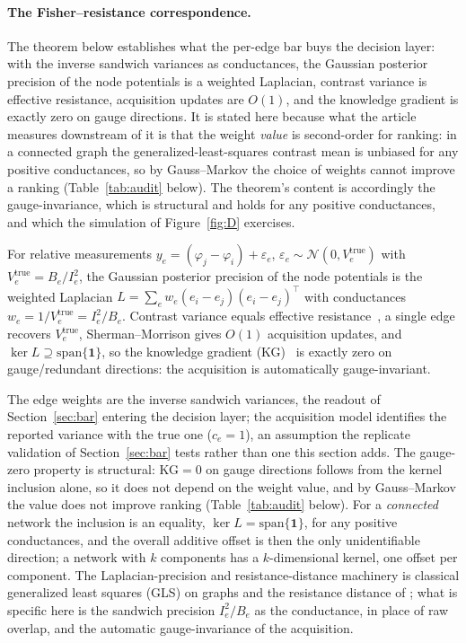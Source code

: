 \paragraph{The Fisher--resistance correspondence.} The theorem below establishes what the
per-edge bar buys the decision layer: with the inverse sandwich variances as conductances, the
Gaussian posterior precision of the node potentials is a weighted Laplacian, contrast variance is
effective resistance, acquisition updates are $O(1)$, and the knowledge gradient is exactly zero on
gauge directions. It is stated here because what the article measures downstream of it is that the
weight \emph{value} is second-order for ranking: in a connected graph
the generalized-least-squares contrast mean is unbiased for any positive conductances, so by
Gauss--Markov the choice of weights cannot improve a ranking (Table~\ref{tab:audit} below). The
theorem's content is accordingly the gauge-invariance, which is structural and holds for any
positive conductances, and which the simulation of Figure~\ref{fig:D} exercises.

\begin{theorem}\label{thm:fr}
For relative measurements $y_e=(\varphi_j-\varphi_i)+\varepsilon_e$,
$\varepsilon_e\sim\mathcal N(0,V_e^{\mathrm{true}})$ with $V_e^{\mathrm{true}}=B_e/I_e^2$, the
Gaussian posterior precision of
the node potentials is the weighted Laplacian $L=\sum_e w_e(e_i-e_j)(e_i-e_j)^\top$ with
conductances $w_e=1/V_e^{\mathrm{true}}=I_e^2/B_e$. Contrast variance equals effective
resistance~\citep{klein1993resistance}, a single edge recovers $V_e^{\mathrm{true}}$,
Sherman--Morrison gives
$O(1)$ acquisition updates, and $\ker L\supseteq\mathrm{span}\{\mathbf 1\}$, so the knowledge
gradient (KG)~\citep{frazier2008kg} is exactly zero on gauge/redundant directions: the acquisition is
automatically gauge-invariant.
\end{theorem}
The edge weights are the inverse sandwich variances, the readout of Section~\ref{sec:bar}
entering the decision layer; the acquisition model identifies the reported variance with the true
one ($c_e=1$), an assumption the replicate validation of Section~\ref{sec:bar} tests rather than
one this section adds. The gauge-zero property is structural: KG$=0$ on gauge directions
follows from the kernel inclusion alone, so it does not depend on the weight value, and by
Gauss--Markov the value does not improve ranking (Table~\ref{tab:audit} below). For a \emph{connected}
network the inclusion is an equality, $\ker L=\mathrm{span}\{\mathbf 1\}$, for any positive
conductances, and the overall additive offset is then the only unidentifiable direction; a network
with $k$ components has a $k$-dimensional kernel, one offset per component. The
Laplacian-precision and resistance-distance machinery is classical generalized least squares (GLS)
on graphs and the resistance distance of \citet{klein1993resistance}; what is specific here is the
sandwich precision $I_e^2/B_e$ as the conductance, in place of raw overlap, and the automatic
gauge-invariance of the acquisition.

